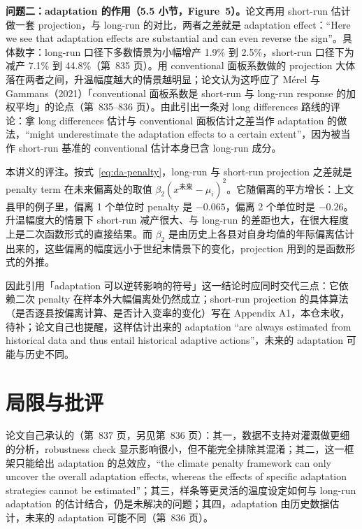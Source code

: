 \textbf{问题二：adaptation 的作用（5.5 小节，Figure~5）。}论文再用 short-run 估计做一套 projection，与 long-run 的对比，两者之差就是 adaptation effect：``Here we see that adaptation effects are substantial and can even reverse the sign''\citep[第~835 页]{da2024climate}。具体数字：long-run 口径下多数情景为小幅增产 1.9\% 到 2.5\%，short-run 口径下为减产 7.1\% 到 44.8\%（第~835 页）。用 conventional 面板系数做的 projection 大体落在两者之间，升温幅度越大的情景越明显；论文认为这呼应了 Mérel 与 Gammans（2021）「conventional 面板系数是 short-run 与 long-run response 的加权平均」的论点（第~835--836 页）。由此引出一条对 long differences 路线的评论：拿 long differences 估计与 conventional 面板估计之差当作 adaptation 的做法，``might underestimate the adaptation effects to a certain extent''\citep[第~836 页]{da2024climate}，因为被当作 short-run 基准的 conventional 估计本身已含 long-run 成分。

\begin{pitfall}
本讲义的评注。按式~\ref{eq:da-penalty}，long-run 与 short-run projection 之差就是 penalty term 在未来偏离处的取值 $\beta_2(x^{\text{未来}}-\mu_i)^2$。它随偏离的平方增长：上文县甲的例子里，偏离 1 个单位时 penalty 是 $-0.065$，偏离 2 个单位时是 $-0.26$。升温幅度大的情景下 short-run 减产很大、与 long-run 的差距也大，在很大程度上是二次函数形式的直接结果。而 $\beta_2$ 是由历史上各县对自身均值的年际偏离估计出来的，这些偏离的幅度远小于世纪末情景下的变化，projection 用到的是函数形式的外推。

因此引用「adaptation 可以逆转影响的符号」这一结论时应同时交代三点：它依赖二次 penalty 在样本外大幅偏离处仍然成立；short-run projection 的具体算法（是否逐县按偏离计算、是否计入变率的变化）写在 Appendix A1，本仓未收，待补；论文自己也提醒，这样估计出来的 adaptation ``are always estimated from historical data and thus entail historical adaptive actions''\citep[第~836 页]{da2024climate}，未来的 adaptation 可能与历史不同。
\end{pitfall}

\section{局限与批评}

论文自己承认的（第~837 页，另见第~836 页）：其一，数据不支持对灌溉做更细的分析，robustness check 显示影响很小，但不能完全排除其混淆；其二，这一框架只能给出 adaptation 的总效应，``the climate penalty framework can only uncover the overall adaptation effects, whereas the effects of specific adaptation strategies cannot be estimated''\citep[第~837 页]{da2024climate}；其三，样条等更灵活的温度设定如何与 long-run adaptation 的估计结合，仍是未解决的问题；其四，adaptation 由历史数据估计，未来的 adaptation 可能不同（第~836 页）。

